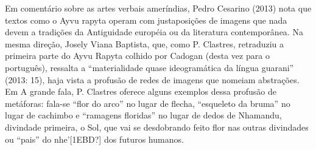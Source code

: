 \documentclass{article}
\begin{document}
Em coment\'ario sobre as artes verbais amer\'indias, Pedro Cesarino
(2013) nota que textos como o Ayvu rapyta operam com
justaposi\c{c}\~oes de imagens que nada devem a tradi\c{c}\~oes da
Antiguidade europ\'eia ou da literatura contempor\^anea. Na mesma
dire\c{c}\~ao, Josely Viana Baptista, que, como P. Clastres, retraduziu
a primeira parte do Ayvu Rapyta colhido por Cadogan (desta vez para o
portugu\^es), ressalta a {\textquotedblleft}materialidade quase
ideogram\'atica da l\'ingua guarani{\textquotedblright} (2013: 15),
haja vista a profus\~ao de redes de imagens que nomeiam
abstra\c{c}\~oes. Em A grande fala, P. Clastres oferece alguns exemplos
dessa profus\~ao de met\'aforas: fala-se {\textquotedblleft}flor do
arco{\textquotedblright} no lugar de flecha,
{\textquotedblleft}esqueleto da bruma{\textquotedblright} no lugar de
cachimbo e {\textquotedblleft}ramagens floridas{\textquotedblright} no
lugar de dedos de Nhamandu, divindade primeira, o Sol, que vai se
desdobrando feito flor nas outras divindades ou
{\textquotedblleft}pais{\textquotedblright} do
nhe{\textquoteright}[1EBD?] dos futuros humanos.
\end{document}
